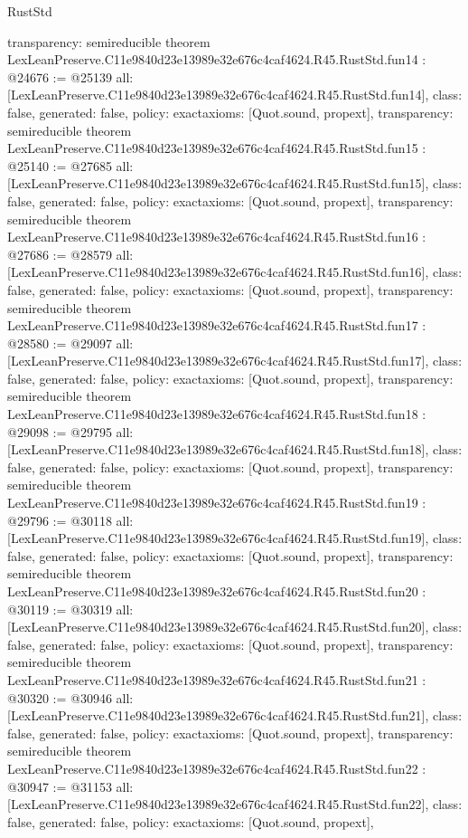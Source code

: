 \begin{lexlean}{RustStd}
\begin{coremodule}
{  transparency: semireducible
}
theorem LexLeanPreserve.C11e9840d23e13989e32e676c4caf4624.R45.RustStd.fun14 : @24676 := @25139 {
  all: [LexLeanPreserve.C11e9840d23e13989e32e676c4caf4624.R45.RustStd.fun14],
  class: false,
  generated: false,
  policy: exact{axioms: [Quot.sound, propext]},
  transparency: semireducible
}
theorem LexLeanPreserve.C11e9840d23e13989e32e676c4caf4624.R45.RustStd.fun15 : @25140 := @27685 {
  all: [LexLeanPreserve.C11e9840d23e13989e32e676c4caf4624.R45.RustStd.fun15],
  class: false,
  generated: false,
  policy: exact{axioms: [Quot.sound, propext]},
  transparency: semireducible
}
theorem LexLeanPreserve.C11e9840d23e13989e32e676c4caf4624.R45.RustStd.fun16 : @27686 := @28579 {
  all: [LexLeanPreserve.C11e9840d23e13989e32e676c4caf4624.R45.RustStd.fun16],
  class: false,
  generated: false,
  policy: exact{axioms: [Quot.sound, propext]},
  transparency: semireducible
}
theorem LexLeanPreserve.C11e9840d23e13989e32e676c4caf4624.R45.RustStd.fun17 : @28580 := @29097 {
  all: [LexLeanPreserve.C11e9840d23e13989e32e676c4caf4624.R45.RustStd.fun17],
  class: false,
  generated: false,
  policy: exact{axioms: [Quot.sound, propext]},
  transparency: semireducible
}
theorem LexLeanPreserve.C11e9840d23e13989e32e676c4caf4624.R45.RustStd.fun18 : @29098 := @29795 {
  all: [LexLeanPreserve.C11e9840d23e13989e32e676c4caf4624.R45.RustStd.fun18],
  class: false,
  generated: false,
  policy: exact{axioms: [Quot.sound, propext]},
  transparency: semireducible
}
theorem LexLeanPreserve.C11e9840d23e13989e32e676c4caf4624.R45.RustStd.fun19 : @29796 := @30118 {
  all: [LexLeanPreserve.C11e9840d23e13989e32e676c4caf4624.R45.RustStd.fun19],
  class: false,
  generated: false,
  policy: exact{axioms: [Quot.sound, propext]},
  transparency: semireducible
}
theorem LexLeanPreserve.C11e9840d23e13989e32e676c4caf4624.R45.RustStd.fun20 : @30119 := @30319 {
  all: [LexLeanPreserve.C11e9840d23e13989e32e676c4caf4624.R45.RustStd.fun20],
  class: false,
  generated: false,
  policy: exact{axioms: [Quot.sound, propext]},
  transparency: semireducible
}
theorem LexLeanPreserve.C11e9840d23e13989e32e676c4caf4624.R45.RustStd.fun21 : @30320 := @30946 {
  all: [LexLeanPreserve.C11e9840d23e13989e32e676c4caf4624.R45.RustStd.fun21],
  class: false,
  generated: false,
  policy: exact{axioms: [Quot.sound, propext]},
  transparency: semireducible
}
theorem LexLeanPreserve.C11e9840d23e13989e32e676c4caf4624.R45.RustStd.fun22 : @30947 := @31153 {
  all: [LexLeanPreserve.C11e9840d23e13989e32e676c4caf4624.R45.RustStd.fun22],
  class: false,
  generated: false,
  policy: exact{axioms: [Quot.sound, propext]},
}
\end{coremodule}
\end{lexlean}
